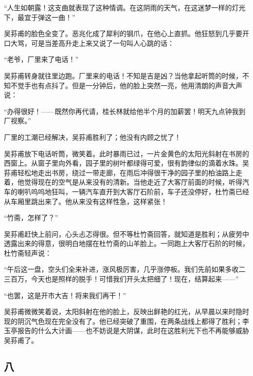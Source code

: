 \par “人生如朝露！这支曲就表现了这种情调。在这阴雨的天气，在这迷梦一样的灯光下，最宜于弹这一曲！”
\par 吴荪甫的脸色全变了。恶兆化成了犀利的钢爪，在他心上直抓。他狂怒到几乎要开口大骂，可是当差高升走上来又说了一句叫人心跳的话：
\par “老爷，厂里来了电话！”
\par 吴荪甫转身就往里边跑。厂里来的电话！不知是吉是凶？当他拿起听筒的时候，不知不觉手也有点抖了。但是一分钟后，他的脸上突然一亮，他用清朗的声音大声说：
\par “办得很好！——既然你再代请，桂长林就给他半个月的加薪罢！明天九点钟我到厂视察。”
\par 厂里的工潮已经解决，吴荪甫胜利了；他没有内顾之忧了！
\par 吴荪甫放下电话听筒，微笑着。此时暴雨已过，一片金黄色的太阳光斜射在书房的西窗上。从窗子里向外看，园子里的树叶都绿得可爱，很有韵律似的滴着水珠。吴荪甫轻松地走出书房，绕过一带走廊，在雨后冲得很干净的园子里的柏油路上走着，他觉得现在的空气是从来没有的清新。当他走近了大客厅前面的时候，听得汽车的喇叭呜呜地狂叫，一辆汽车直开到大客厅石阶前，车子还没停好，杜竹斋已经从车厢里跳出来了。他从来没有这样性急，这样紧张！
\par “竹斋，怎样了？”
\par 吴荪甫赶快上前问，心头忐忑得很。但不等杜竹斋回答，就知道是胜利；从疲劳中透露出来的得意，很明白地摆在杜竹斋的山羊脸上。一同跑上大客厅石阶的时候，杜竹斋轻声说：
\par “午后这一盘，空头们全来补进，涨风极厉害，几乎涨停板。我们先前如果多收二三百万，今天也是照样的脱手！可惜我们开头太把细了！现在，结算起来——”
\par “也罢，这是开市大吉！将来我们再干！”
\par 吴荪甫微微笑着说，太阳斜射在他的脸上，反映出鲜艳的红光，从早晨以来时隐时现的阴沉气色现在完全没有了。他已经突破了重围，在两条战线上都得了胜利；李玉亭报告的什么大计画——也不妨说是大阴谋，此时在这胜利光下也不再能够威胁吴荪甫了。



\subsection*{八}

